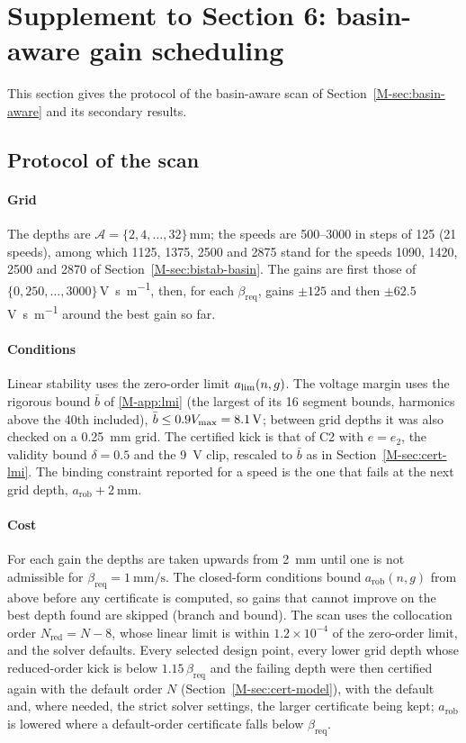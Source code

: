 \section{Supplement to Section 6: basin-aware gain scheduling}\label{supp:ba}

This section gives the protocol of the basin-aware scan of Section~\ref{M-sec:basin-aware} and its secondary results.

\subsection{Protocol of the scan}\label{supp:ba-protocol}

\paragraph{Grid} The depths are $\mathcal A=\{2,4,\dots,32\}$\,\si{\milli\metre}; the speeds are 500--\SI{3000}{\rpm} in steps of \SI{125}{\rpm} (21 speeds), among which 1125, 1375, 2500 and \SI{2875}{\rpm} stand for the speeds 1090, 1420, 2500 and \SI{2870}{\rpm} of Section~\ref{M-sec:bistab-basin}. The gains are first those of $\{0,250,\dots,3000\}$\,\si{\volt\second\per\metre}, then, for each $\beta_{\mathrm{req}}$, gains $\pm125$ and then $\pm62.5$\,\si{\volt\second\per\metre} around the best gain so far.

\paragraph{Conditions} Linear stability uses the zero-order limit $a_{\lim}(n,g)$. The voltage margin uses the rigorous bound $\bar b$ of \ref{M-app:lmi} (the largest of its 16 segment bounds, harmonics above the 40th included), $\bar b\le0.9V_{\max}=\SI{8.1}{\volt}$; between grid depths it was also checked on a \SI{0.25}{\milli\metre} grid. The certified kick is that of C2 with $e=e_2$, the validity bound $\delta=0.5$ and the \SI{9}{\volt} clip, rescaled to $\bar b$ as in Section~\ref{M-sec:cert-lmi}. The binding constraint reported for a speed is the one that fails at the next grid depth, $a_{\mathrm{rob}}+\SI{2}{\milli\metre}$.

\paragraph{Cost} For each gain the depths are taken upwards from \SI{2}{\milli\metre} until one is not admissible for $\beta_{\mathrm{req}}=\SI{1}{\milli\metre\per\second}$. The closed-form conditions bound $a_{\mathrm{rob}}(n,g)$ from above before any certificate is computed, so gains that cannot improve on the best depth found are skipped (branch and bound). The scan uses the collocation order $N_{\mathrm{red}}=N-8$, whose linear limit is within $1.2\times10^{-4}$ of the zero-order limit, and the solver defaults. Every selected design point, every lower grid depth whose reduced-order kick is below $1.15\,\beta_{\mathrm{req}}$ and the failing depth were then certified again with the default order $N$ (Section~\ref{M-sec:cert-model}), with the default and, where needed, the strict solver settings, the larger certificate being kept; $a_{\mathrm{rob}}$ is lowered where a default-order certificate falls below $\beta_{\mathrm{req}}$.

